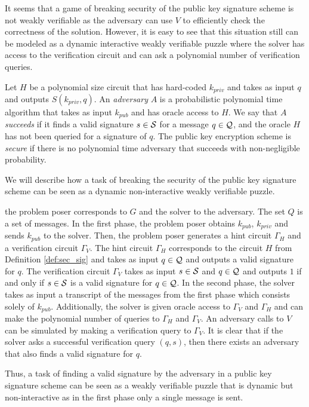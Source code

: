 It seems that a game of breaking security of the public key signature scheme is not weakly verifiable as the adversary can use $V$
to efficiently check the correctness of the solution. However, it is easy to see that this situation still can be modeled as
a dynamic interactive weakly verifiable puzzle where the solver has access to the verification circuit and can ask a polynomial number of verification queries.
%
\begin{definition}
  \label{def:sec_sig}
Let $H$ be a polynomial size circuit that has hard-coded $k_{priv}$ and takes as input $q$ and outputs $S(k_{priv}, q)$.
An \textit{adversary} $A$ is a probabilistic polynomial time algorithm that takes as input $k_{pub}$ and has oracle access to $H$.
We say that $A$ \textit{succeeds} if it finds a valid signature $s \in \mathcal{S}$ for a message $q \in \mathcal{Q}$, and the oracle $H$ has not been queried for a signature of $q$.
The public key encryption scheme is \textit{secure} if there is no polynomial time adversary that succeeds with non-negligible probability.
\end{definition}
%
We will describe how a task of breaking the security of the public key signature scheme can be
seen as a dynamic non-interactive weakly verifiable puzzle.

the problem poser corresponds to $G$ and the solver to the adversary. The set $Q$ is a set of messages.
In the first phase, the problem poser obtains $k_{pub}$, $k_{priv}$ and sends $k_{pub}$ to the solver.
Then, the problem poser generates a hint circuit $\Gamma_H$ and a verification circuit $\Gamma_V$.
The hint circuit $\Gamma_H$ corresponds to the circuit $H$ from Definition \ref{def:sec_sig} and takes as input $q \in \mathcal{Q}$ and outputs a valid signature for $q$.
The verification circuit $\Gamma_V$ takes as input $s \in \mathcal{S}$ and $q \in \mathcal{Q}$ and outputs $1$ if and only if $s \in \mathcal{S}$ is a valid signature for $q \in \mathcal{Q}$.
In the second phase, the solver takes as input a transcript of the messages from the first phase which consists solely of $k_{pub}$.
Additionally, the solver is given oracle access to $\Gamma_V$ and $\Gamma_H$ and can make the polynomial number of queries to $\Gamma_H$ and $\Gamma_V$.
An adversary calls to $V$ can be simulated by making a verification query to $\Gamma_V$.
It is clear that if the solver asks a successful verification query $(q,s)$,
then there exists an adversary that also finds a valid signature for $q$.

Thus, a task of finding a valid signature by the adversary in a public key signature scheme can be seen as a weakly verifiable puzzle that
is dynamic but non-interactive as in the first phase only a single message is sent.


